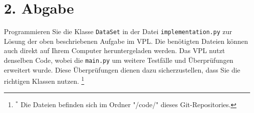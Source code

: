 \documentclass[]{article}
\begin{document}
\section*{2. Abgabe}
Programmieren Sie die Klasse \texttt{DataSet} in der Datei \texttt{implementation.py} zur Lösung der oben beschriebenen Aufgabe im VPL. Die benötigten Dateien können auch direkt auf Ihrem Computer heruntergeladen werden. Das VPL nutzt denselben Code, wobei die \texttt{main.py} um weitere Testfälle und Überprüfungen erweitert wurde. Diese Überprüfungen dienen dazu sicherzustellen, dass Sie die richtigen Klassen nutzen. 
\footnote{$^{*}$ Die Dateien befinden sich im Ordner "/code/" dieses Git-Repositories.}
\end{document}
